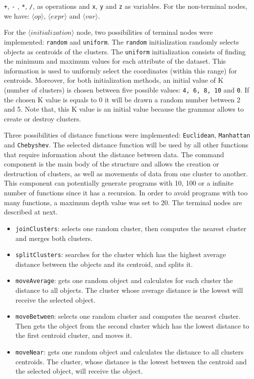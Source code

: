\documentclass[conference]{IEEEtran}
\begin{document}
	
	\texttt{+}, \texttt{-} , \texttt{*}, \texttt{/}, as operations and \texttt{x}, \texttt{y} and \texttt{z} as variables. For the non-terminal nodes, we have: $\langle op \rangle$, $\langle expr \rangle$  and $\langle var \rangle$. 
	
	
	For the $\langle initialization \rangle$ node, two possibilities of terminal nodes were implemented: \texttt{random} and \texttt{uniform}. The \texttt{random} initialization randomly selects  objects as centroids of the clusters. The \texttt{uniform} initialization consists of finding the minimum and maximum values for each attribute of the dataset. This information is used to uniformly select the coordinates (within this range) for centroids. Moreover, for both initialization methods, an initial value of K (number of clusters) is chosen between five possible values: \texttt{4, 6, 8, 10} and \texttt{0}. If the chosen K value is equals to 0 it will be drawn a random number between 2 and 5. Note that, this K value is an initial value because the grammar allows to create or destroy clusters. 
	
	
	Three possibilities of distance functions were implemented: \texttt{Euclidean}, \texttt{Manhattan} and \texttt{Chebyshev}. The selected distance function will be used by all other functions that require information about the distance between data. The command component is the main body of the structure and allows the creation or destruction of clusters, as well as movements of data from one cluster to another. This component can potentially generate programs with 10, 100 or a infinite number of functions since it has a recursion. In order to avoid programs with too many functions, a maximum depth value was set to 20. The terminal nodes are described at next.
	
	
	\begin{itemize}
		\item \texttt{joinClusters}:  selects one random cluster, then computes the nearest cluster and merges both clusters.
		\item \texttt{splitClusters}:  searches for the cluster which has the highest average distance between the objects and its centroid, and splits it. 
		\item \texttt{moveAverage}:   gets one random object and calculates for each cluster the distance to all objects. The cluster whose average distance is the lowest will receive the selected object.
		\item \texttt{moveBetween}:  selects one random cluster and computes the nearest cluster. Then gets the object from the second cluster which has the lowest distance to the first centroid cluster, and moves it.
		\item \texttt{moveNear}:   gets one random object and calculates the distance to all clusters centroids. The cluster, whose distance is the lowest between the centroid and the selected object, will receive the object.
	\end{itemize}
	
\end{document}
